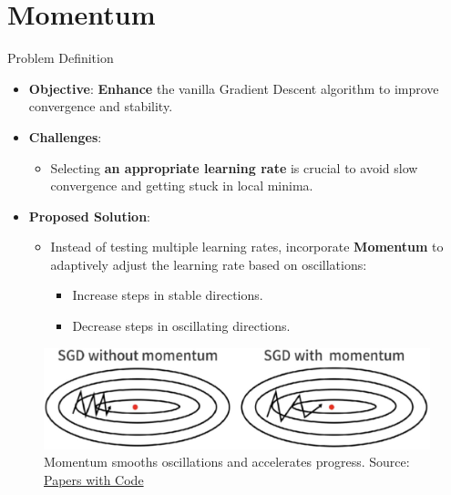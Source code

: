 \documentclass[serif, aspectratio=169]{beamer}
\begin{document}
\section{Momentum}
\begin{frame}{Problem Definition}
    \begin{minipage}{0.6\textwidth}
    \begin{itemize}
        \item \textbf{Objective}: \textbf{Enhance} the vanilla Gradient Descent algorithm to improve convergence and stability.
        \item \textbf{Challenges}:
        \begin{itemize}
            \item Selecting \textbf{an appropriate learning rate} is crucial to avoid slow convergence and getting stuck in local minima.
        \end{itemize}
        \item \textbf{Proposed Solution}:
        \begin{itemize}
            \item Instead of testing multiple learning rates, incorporate \textbf{Momentum} to adaptively adjust the learning rate based on oscillations:
            \begin{itemize}
                \item Increase steps in stable directions.
                \item Decrease steps in oscillating directions.
            \end{itemize}
        \end{itemize}
    \end{itemize}
    \end{minipage}%
    \begin{minipage}{0.3\textwidth}
        \begin{figure}[h]
            \centering
            \includegraphics[height=0.2\textheight]{pic/momentum_paperswithcode.jpg}
            \caption{\footnotesize Momentum smooths oscillations and accelerates progress. Source: \href{https://paperswithcode.com/method/sgd-with-momentum}{Papers with Code}}
        \end{figure}
    \end{minipage}
\end{frame}
\end{document}
